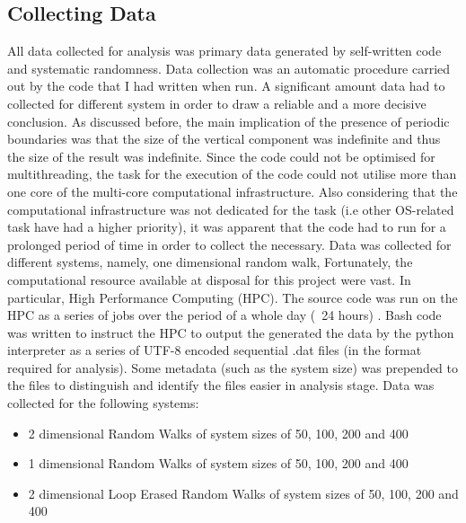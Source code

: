 \documentclass{article}
\begin{document}
\subsection{Collecting Data}
	 All data collected for analysis was primary data generated by self-written code and systematic randomness. Data collection was an automatic procedure carried out by the code that I had written when run. A significant amount data had to collected for different system in order to draw a reliable and a more decisive conclusion. As discussed before, the main implication of the presence of periodic boundaries was that the size of the vertical component was indefinite and thus the size of the result was indefinite. Since the code could not be optimised for multithreading, the task for the execution of the code could not utilise more than one core of the multi-core computational infrastructure. Also considering that the computational infrastructure was not dedicated for the task (i.e other OS-related task have had a higher priority), it was apparent that the code had to run for a prolonged period of time in order to collect the necessary. Data was collected for different systems, namely, one dimensional random walk,
\newline
Fortunately, the computational resource available at disposal for this project were vast.  In particular, High Performance Computing (HPC). The source code was run on the HPC as a series of jobs over the period of a whole day (~24 hours) . Bash code was written to instruct the HPC to output the generated the data by the python interpreter as a series of UTF-8 encoded sequential .dat files (in the format required for analysis). Some metadata (such as the system size) was prepended to the files to distinguish and identify the files easier in analysis stage.
\newline
Data was collected for the following systems:
\begin{itemize}
	\item 2 dimensional Random Walks of system sizes of 50, 100, 200 and 400
	\item 1 dimensional Random Walks of system sizes of 50, 100, 200 and 400
	\item 2 dimensional Loop Erased Random Walks of system sizes of 50, 100, 200 and 400
\end{itemize}
\end{document}
